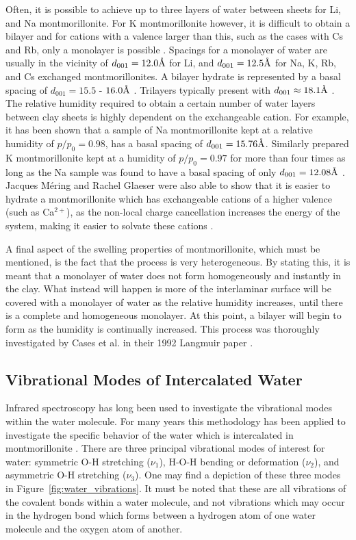 Often, it is possible to achieve up to three layers of water between sheets for Li, and Na montmorillonite. For K montmorillonite however, it is difficult to obtain a bilayer and for cations with a valence larger than this, such as the cases with Cs and Rb, only a monolayer is possible \cite{mering1964gonflement}. Spacings for a monolayer of water are usually in the vicinity of $d_{001}=12.0\text{\normalfont\AA}$ for Li, and $d_{001}=12.5\text{\normalfont\AA}$ for Na, K, Rb, and Cs exchanged montmorillonites. A bilayer hydrate is represented by a basal spacing of $d_{001}=15.5$ - $16.0\text{\normalfont\AA}$ \cite{berend1995mechanism}. Trilayers typically present with $d_{001}\approx 18.1\text{\normalfont\AA}$ \cite{cases1992mechanism}. The relative humidity required to obtain a certain number of water layers between clay sheets is highly dependent on the exchangeable cation. For example, it has been shown that a sample of Na montmorillonite kept at a relative humidity of $p/p_0=0.98$, has a basal spacing of $d_{001}=15.76\text{\normalfont\AA}$. Similarly prepared K montmorillonite kept at a humidity of $p/p_0=0.97$ for more than four times as long as the Na sample was found to have a basal spacing of only $d_{001}=12.08\text{\normalfont\AA}$ \cite{berend1995mechanism}. Jacques Méring and Rachel Glaeser were also able to show that it is easier to hydrate a montmorillonite which has exchangeable cations of a higher valence (such as Ca$^{2+}$), as the non-local charge cancellation increases the energy of the system, making it easier to solvate these cations \cite{mering1953role}.

A final aspect of the swelling properties of montmorillonite, which must be mentioned, is the fact that the process is very heterogeneous. By stating this, it is meant that a monolayer of water does not form homogeneously and instantly in the clay. What instead will happen is more of the interlaminar surface will be covered with a monolayer of water as the relative humidity increases, until there is a complete and homogeneous monolayer. At this point, a bilayer will begin to form as the humidity is continually increased. This process was thoroughly investigated by Cases et al. in their 1992 Langmuir paper \cite{cases1992mechanism}.

\subsection{Vibrational Modes of Intercalated Water}
Infrared spectroscopy has long been used to investigate the vibrational modes within the water molecule. For many years this methodology has been applied to investigate the specific behavior of the water which is intercalated in montmorillonite \cite{madejova2003ftir}. There are three principal vibrational modes of interest for water: symmetric O-H stretching ($\nu_1$), H-O-H bending or deformation ($\nu_2$), and asymmetric O-H stretching ($\nu_3$). One may find a depiction of these three modes in Figure~\ref{fig:water_vibrations}. It must be noted that these are all vibrations of the covalent bonds within a water molecule, and not vibrations which may occur in the hydrogen bond which forms between a hydrogen atom of one water molecule and the oxygen atom of another.

